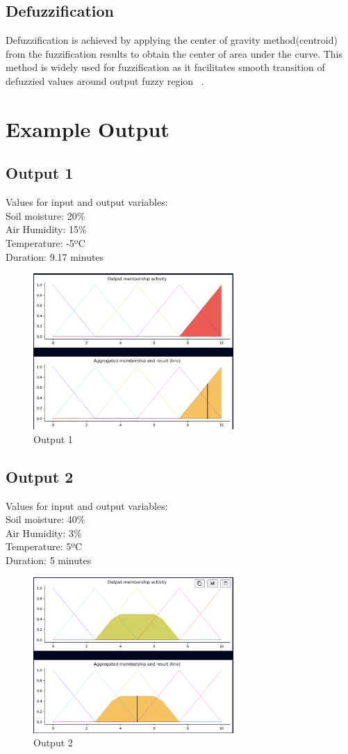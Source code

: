 \documentclass[conference]{IEEEtran}
\begin{document}
\subsection{Defuzzification}
Defuzzification is achieved by applying the center of gravity method(centroid) from the fuzzification results to obtain the center of area under the curve. This method is widely used for fuzzification as it facilitates smooth transition of defuzzied values around output fuzzy region ~\cite{JAISWAL2020105537}.

\section{Example Output}
\subsection{Output 1}
Values for input and output variables: \\
Soil moisture: 20\% \\
Air Humidity: 15\% \\
Temperature: -5ºC \\
Duration: 9.17 minutes 
\begin{figure}[!ht]
    \centering
     \includegraphics[width=3in]{graphs/20_15_-5.png}
    \caption{Output 1} 
\end{figure}

\subsection{Output 2}
Values for input and output variables: \\
Soil moisture: 40\% \\
Air Humidity: 3\% \\
Temperature: 5ºC \\
Duration: 5 minutes 
\begin{figure}[!ht]
    \centering
     \includegraphics[width=3in]{graphs/40_3_5.png}
    \caption{Output 2} 
\end{figure}
\end{document}
